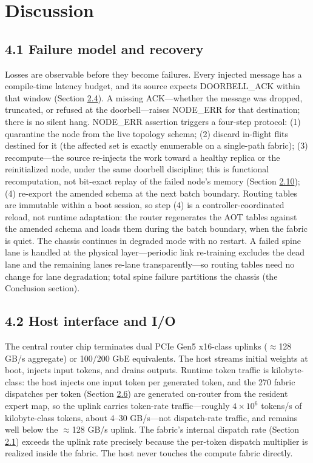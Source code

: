 \documentclass[12pt,onecolumn]{article}
\begin{document}
\section*{Discussion}\label{sec:discussion}

\subsection*{4.1 Failure model and recovery}\label{sec:4.1}

Losses are observable before they become failures. Every injected message has a compile-time latency budget, and its source expects DOORBELL\_ACK within that window (Section \hyperref[sec:2.4]{2.4}). A missing ACK---whether the message was dropped, truncated, or refused at the doorbell---raises NODE\_ERR for that destination; there is no silent hang. NODE\_ERR assertion triggers a four-step protocol: (1) quarantine the node from the live topology schema; (2) discard in-flight flits destined for it (the affected set is exactly enumerable on a single-path fabric); (3) recompute---the source re-injects the work toward a healthy replica or the reinitialized node, under the same doorbell discipline; this is functional recomputation, not bit-exact replay of the failed node's memory (Section \hyperref[sec:2.10]{2.10}); (4) re-export the amended schema at the next batch boundary. Routing tables are immutable within a boot session, so step (4) is a controller-coordinated reload, not runtime adaptation: the router regenerates the AOT tables against the amended schema and loads them during the batch boundary, when the fabric is quiet. The chassis continues in degraded mode with no restart. A failed spine lane is handled at the physical layer---periodic link re-training excludes the dead lane and the remaining lanes re-lane transparently---so routing tables need no change for lane degradation; total spine failure partitions the chassis (the Conclusion section).

\subsection*{4.2 Host interface and I/O}\label{sec:4.2}

The central router chip terminates dual PCIe Gen5 x16-class uplinks ($\approx$128 GB/s aggregate) or 100/200 GbE equivalents. The host streams initial weights at boot, injects input tokens, and drains outputs. Runtime token traffic is kilobyte-class: the host injects one input token per generated token, and the 270 fabric dispatches per token (Section \hyperref[sec:2.6]{2.6}) are generated on-router from the resident expert map, so the uplink carries token-rate traffic---roughly $4\times10^{6}$ tokens/s of kilobyte-class tokens, about 4--30 GB/s---not dispatch-rate traffic, and remains well below the $\approx$128 GB/s uplink. The fabric's internal dispatch rate (Section \hyperref[sec:2.1]{2.1}) exceeds the uplink rate precisely because the per-token dispatch multiplier is realized inside the fabric. The host never touches the compute fabric directly.
\end{document}
